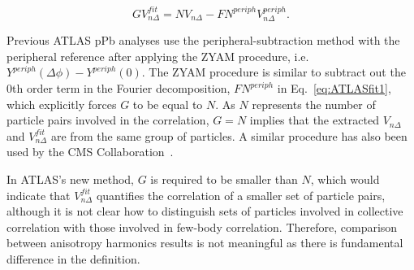 \documentclass[12pt]{article}
\begin{document}
\begin{linenomath}
\begin{equation}
\label{eq:ATLASfit2}
GV_{n\Delta}^{fit} = NV_{n\Delta} - FN^{periph}V_{n\Delta}^{periph}.
\end{equation}
\end{linenomath}

Previous ATLAS pPb analyses use the peripheral-subtraction method with the peripheral reference after applying the ZYAM procedure,
i.e. $Y^{periph}(\Delta\phi) - Y^{periph}(0)$.
The ZYAM procedure is similar to subtract out the 0th order term in the Fourier decomposition, $FN^{periph}$ in Eq.~\ref{eq:ATLASfit1},
which explicitly forces $G$ to be equal to $N$. As $N$ represents the number of particle pairs involved in the correlation,
$G = N$ implies that the extracted $V_{n\Delta}$ and $V_{n\Delta}^{fit}$ are from the same group of particles.
A similar procedure has also been used by the CMS Collaboration~\cite{Chatrchyan:2013nka}.

In ATLAS's new method, $G$ is required to be smaller than $N$, 
which would indicate that $V_{n\Delta}^{fit}$ quantifies the correlation of a smaller set of particle pairs,
although it is not clear how to distinguish sets of particles involved in collective correlation with those involved in few-body correlation.
Therefore, comparison between anisotropy harmonics results is not meaningful as there is fundamental difference in the definition.







\clearpage
\end{document}

